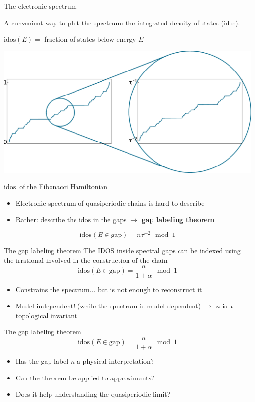 \documentclass[xcolor=x11names,compress,professionalfonts]{beamer}
\renewcommand{\(}{\begin{columns}}
\renewcommand{\)}{\end{columns}}
\newcommand{\<}[1]{\begin{column}{#1}}
\renewcommand{\>}{\end{column}}
\newcommand{\id}{\ensuremath{\text{idos}}}
\begin{document}
\begin{frame}{The electronic spectrum}

A convenient way to plot the spectrum: the integrated density of states ($\id$).

$\id(E) = $ fraction of states below energy $E$

{\centering
\includegraphics[scale=.35]{img/idos_scaling.pdf}

\small{\id~of the Fibonacci Hamiltonian}

}

\begin{itemize}
	\item Electronic spectrum of quasiperiodic chains is hard to describe
	\item Rather: describe the $\id$ in the gaps $\to$ \textbf{gap labeling theorem}
\end{itemize}
\[
	\id(E\in \text{gap}) = n \tau^{-2} \mod 1
\]

\end{frame}

\begin{frame}{The gap labeling theorem}
The IDOS inside spectral gaps can be indexed using the irrational involved in the construction of the chain
	\[
		\id(E \in \text{gap}) = \frac{n}{1+\alpha} \mod 1
	\]
\begin{itemize}
	\item Constrains the spectrum... but is not enough to reconstruct it
	\item Model independent! (while the spectrum is model dependent) $\rightarrow$ $n$ is a topological invariant
\end{itemize}


\end{frame}

\begin{frame}{The gap labeling theorem}
\[
		\id(E \in \text{gap}) = \frac{n}{1+\alpha} \mod 1
	\]
\begin{itemize}
	\item Has the gap label $n$ a physical interpretation?
\end{itemize}
\begin{itemize}
	\item Can the theorem be applied to approximants? 
	\item Does it help understanding the quasiperiodic limit?
\end{itemize}

\end{frame}
\end{document}
